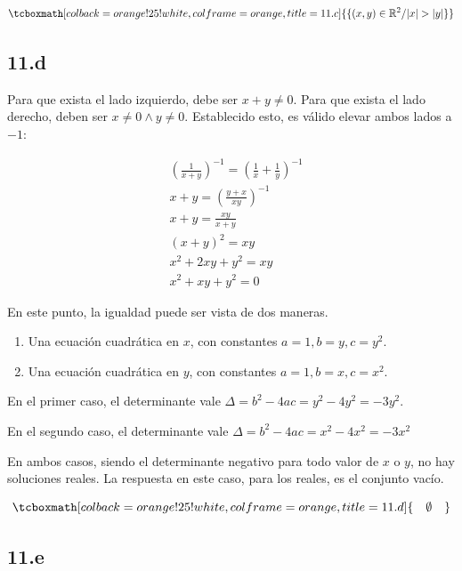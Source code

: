 \documentclass{article}
\newcommand{\hresult}[2]{\tcboxmath[colback=orange!25!white,colframe=orange, title=#1] {#2} }
\newcommand{\hresulte}[3]{\tcboxmath[colback=orange!25!white,colframe=orange, title=#1] { \hspace{#3} #2 \hspace{#3} } }
\begin{document}
\begin{equation}
\hresult{11.c}{ \{ (x,y) \in \mathbb{R}^2 / |x| > |y| \} }
\end{equation}

\subsection*{11.d}
\label{subsec:11.d}

Para que exista el lado izquierdo, debe ser $x + y \neq 0$. Para que exista el lado derecho, deben ser $x \neq 0 \wedge y \neq 0$. Establecido esto, es válido elevar ambos lados a $-1$:

\begin{subequations}
\begin{align}
& \left( \frac{1}{x+y} \right)^{-1} = \left( \frac{1}{x} + \frac{1}{y} \right)^{-1} \\
& x + y = \left( \frac{y+x}{xy} \right)^{-1} \\
& x + y = \frac{xy}{x+y} \\
& (x+y)^2 = xy \\
& x^2 + 2xy + y^2 = xy \\
& x^2 + xy + y^2 = 0
\end{align}
\end{subequations}

En este punto, la igualdad puede ser vista de dos maneras.

\begin{enumerate}
\item Una ecuación cuadrática en $x$, con constantes $a = 1, b=y, c=y^2$.
\item Una ecuación cuadrática en $y$, con constantes $a = 1, b=x, c=x^2$.
\end{enumerate}

En el primer caso, el determinante vale $\Delta = b^2 - 4 a c = y^2 - 4y^2 = -3y^2$.

En el segundo caso, el determinante vale $ \Delta = b^2 - 4 a c = x^2 - 4x^2 = -3x^2 $

En ambos casos, siendo el determinante negativo para todo valor de $x$ o $y$, no hay soluciones reales. La respuesta en este caso, para los reales, es el conjunto vacío.

\begin{equation}
\hresulte{11.d}{ \emptyset }{1em}
\end{equation}

\subsection*{11.e}
\label{subsec:11.e}
\end{document}
